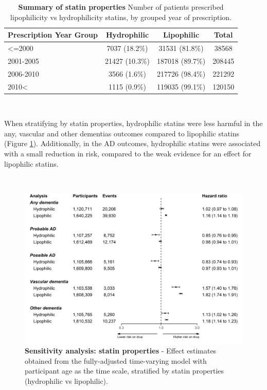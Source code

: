 \documentclass[a4paper, twoside]{templates/ociamthesis}
\begin{document}
\begin{table}[H]

\caption[Summary of statin properties]{\label{tab:statinTypeTable-table}\textbf{Summary of statin properties} Number of patients prescribed lipophilicity vs hydrophilicity statins, by grouped year of prescription.}
\centering
\fontsize{7}{9}\selectfont
\begin{tabular}[t]{lccc}
\toprule
\textbf{\textbf{Prescription Year Group}} & \textbf{\textbf{Hydrophilic}} & \textbf{\textbf{Lipophilic}} & \textbf{\textbf{Total}}\\
\midrule
<=2000 & 7037 (18.2\%) & 31531 (81.8\%) & 38568\\
\midrule
2001-2005 & 21427 (10.3\%) & 187018 (89.7\%) & 208445\\
\midrule
2006-2010 & 3566 (1.6\%) & 217726 (98.4\%) & 221292\\
\midrule
2010< & 1115 (0.9\%) & 119035 (99.1\%) & 120150\\
\bottomrule
\end{tabular}
\end{table}

~

When stratifying by statin properties, hydrophilic statins were less harmful in the any, vascular and other dementias outcomes compared to lipophilic statins (Figure \ref{fig:statinTypeFig}). Additionally, in the AD outcomes, hydrophilic statins were associated with a small reduction in risk, compared to the weak evidence for an effect for lipophilic statins.

~





\begin{figure}[H]
\includegraphics[width=1\linewidth]{figures/cprd-analysis/forester_sta_type} \caption[Sensitivity analysis: statin properties]{\textbf{Sensitivity analysis: statin properties} - Effect estimates obtained from the fully-adjusted time-varying model with participant age as the time scale, stratified by statin properties (hydrophilic vs lipophilic).}\label{fig:statinTypeFig}
\end{figure}
\end{document}
